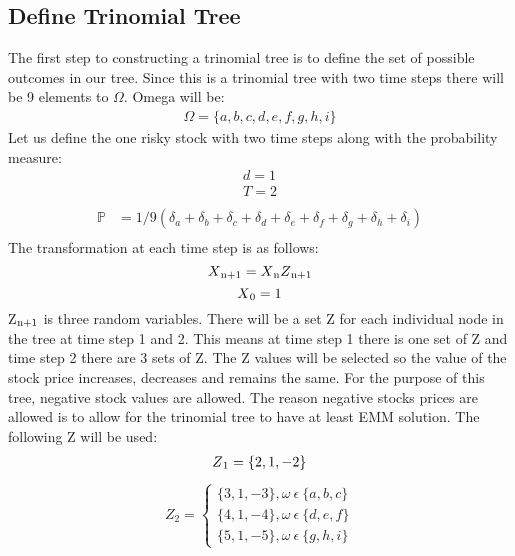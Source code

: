 \documentclass{article}
\begin{document}
\subsection{Define Trinomial Tree}
The first step to constructing a trinomial tree is to define the set of possible outcomes in our tree. Since this is a trinomial tree with two time steps there will be 9 elements to $\Omega$. Omega will be:
\begin{align*}
  \Omega = \{ a, b, c, d, e, f, g, h, i \}
\end{align*}
Let us define the one risky stock with two time steps along with the probability measure:
\begin{align*}
    d=1 \\
    T=2 \\
\end{align*}
\begin{align*}
    \mathbb{P} & = 1/9(\delta_a + \delta_b + \delta_c +\delta_d + \delta_e + \delta_f + \delta_g + \delta_h + \delta_i \label{eq:pstar}) \\
\end{align*}
The transformation at each time step is as follows:
\begin{equation}
 X\textsubscript{n+1}=X\textsubscript{n}Z\textsubscript{n+1} \label{eq:x_transformation}
\end{equation}
\begin{equation}
 X\textsubscript{0}=1
\end{equation}
Z$\textsubscript{n+1}$ is three random variables. There will be a set Z for each individual node in the tree at time step 1 and 2. This means at time step 1 there is one set of Z and time step 2 there are 3 sets of Z. The Z values will be selected so the value of the stock price increases, decreases and remains the same. For the purpose of this tree, negative stock values are allowed. The reason negative stocks prices are allowed is to allow for the trinomial tree to have at least EMM solution. The following Z will be used:
\begin{align*}
 Z\textsubscript{1}= \{ 2, 1, -2 \}
\end{align*}
\begin{align*}
    Z_2 = \begin{cases}
        \{ 3, 1, -3\}, \omega \medspace \epsilon \medspace \{ a, b, c \} \\
        \{ 4, 1, -4\}, \omega \medspace \epsilon \medspace \{ d, e, f \} \\
        \{ 5, 1, -5\}, \omega \medspace \epsilon \medspace \{ g, h, i \}
    \end{cases}
\end{align*}
\end{document}
